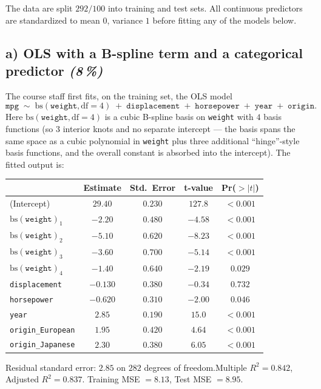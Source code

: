 \documentclass[11pt,a4paper]{article}
\newcommand{\subpoints}[1]{\textit{(#1\,\%)}}
\begin{document}
The data are split $292/100$ into training and test sets. All continuous predictors are standardized to mean $0$, variance $1$ before fitting any of the models below.

\subsection*{a) OLS with a B-spline term and a categorical predictor \subpoints{8}}

The course staff first fits, on the training set, the OLS model
$$\texttt{mpg} \;\sim\; \mathrm{bs}(\texttt{weight}, \text{df}=4) \;+\; \texttt{displacement} \;+\; \texttt{horsepower} \;+\; \texttt{year} \;+\; \texttt{origin}.$$
Here $\mathrm{bs}(\texttt{weight}, \text{df}=4)$ is a cubic B-spline basis on \texttt{weight} with $4$ basis functions (so $3$ interior knots and no separate intercept --- the basis spans the same space as a cubic polynomial in \texttt{weight} plus three additional ``hinge''-style basis functions, and the overall constant is absorbed into the intercept). The fitted output is:

\begin{center}\small
\begin{tabular}{lcccc}
\toprule
 & \textbf{Estimate} & \textbf{Std.\ Error} & \textbf{t-value} & \textbf{Pr($>|t|$)} \\
\midrule
(Intercept)                              & $29.40$ & $0.230$ & $127.8$ & $<0.001$ \\
$\mathrm{bs}(\texttt{weight})_1$         & $-2.20$ & $0.480$ & $-4.58$ & $<0.001$ \\
$\mathrm{bs}(\texttt{weight})_2$         & $-5.10$ & $0.620$ & $-8.23$ & $<0.001$ \\
$\mathrm{bs}(\texttt{weight})_3$         & $-3.60$ & $0.700$ & $-5.14$ & $<0.001$ \\
$\mathrm{bs}(\texttt{weight})_4$         & $-1.40$ & $0.640$ & $-2.19$ & $0.029$  \\
\texttt{displacement}                    & $-0.130$ & $0.380$ & $-0.34$ & $0.732$ \\
\texttt{horsepower}                      & $-0.620$ & $0.310$ & $-2.00$ & $0.046$ \\
\texttt{year}                            & $2.85$  & $0.190$ & $15.0$  & $<0.001$ \\
\texttt{origin\_European}                & $1.95$  & $0.420$ & $4.64$  & $<0.001$ \\
\texttt{origin\_Japanese}                & $2.30$  & $0.380$ & $6.05$  & $<0.001$ \\
\bottomrule
\end{tabular}
\end{center}
\noindent Residual standard error: $2.85$ on $282$ degrees of freedom.\quad Multiple $R^2 = 0.842$, Adjusted $R^2 = 0.837$. Training MSE $= 8.13$, Test MSE $= 8.95$.
\end{document}

